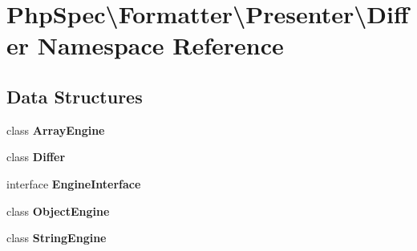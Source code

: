 \section{Php\+Spec\textbackslash{}Formatter\textbackslash{}Presenter\textbackslash{}Differ Namespace Reference}
\label{namespace_php_spec_1_1_formatter_1_1_presenter_1_1_differ}
\subsection*{Data Structures}
\begin{DoxyCompactItemize}
\item 
class {\bf Array\+Engine}
\item 
class {\bf Differ}
\item 
interface {\bf Engine\+Interface}
\item 
class {\bf Object\+Engine}
\item 
class {\bf String\+Engine}
\end{DoxyCompactItemize}
